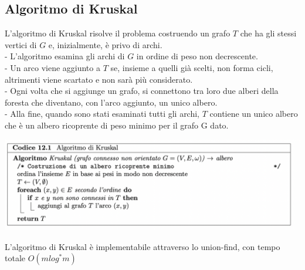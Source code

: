 \documentclass[11pt, oneside]{article}   	%
\begin{document}
\subsection*{Algoritmo di Kruskal}
L'algoritmo di Kruskal risolve il problema costruendo un grafo $T$ che ha gli stessi vertici di $G$ e, inizialmente, è privo di archi. \\
- L’algoritmo esamina gli archi di $G$ in ordine di peso non decrescente. \\
- Un arco viene aggiunto a $T$ se, insieme a quelli già scelti, non forma cicli, altrimenti viene scartato e non sarà più considerato. \\
- Ogni volta che si aggiunge un grafo, si connettono tra loro due alberi della foresta che diventano, con l’arco aggiunto, un unico albero. \\
- Alla fine, quando sono stati esaminati tutti gli archi, $T$ contiene un unico albero che è un albero ricoprente di peso minimo per il grafo G dato.
\begin{center}
\includegraphics[scale=0.7]{kruskal}
\end{center}
L'algoritmo di Kruskal è implementabile attraverso lo union-find, con tempo totale $O(mlog^*m)$
\end{document}
